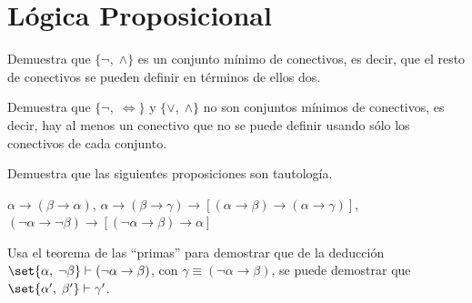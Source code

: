 \documentclass[fc]{tarea}
\begin{document}

\chapter{Lógica Proposicional}

\begin{exercise} Demuestra que \(\{\neg,\;\land\}\) es un conjunto mínimo de conectivos, es decir, 
  que el resto de conectivos se pueden definir en términos de ellos dos.
\end{exercise}  
  
\begin{exercise}
  Demuestra que \(\{\neg,\;\iff\}\) y \(\{\lor,\;\land\}\) no son conjuntos mínimos de conectivos, es decir, 
  hay al menos un conectivo que no se puede definir usando sólo los conectivos de cada conjunto.
\end{exercise}

\begin{exercise}
  Demuestra que las siguientes proposiciones son tautología.
  \begin{tasks}
   \task \(\alpha \rightarrow (\beta \rightarrow \alpha) \),
   \task \(\alpha \rightarrow(\beta \rightarrow \gamma) \rightarrow [(\alpha \rightarrow \beta)\rightarrow(\alpha \rightarrow \gamma)] \), 
    \task \( (\neg \alpha \rightarrow \neg \beta) \rightarrow [(\neg \alpha \rightarrow \beta)\rightarrow \alpha] \)
  \end{tasks}
\end{exercise}


\begin{exercise}
  Usa el teorema de las \enquote{primas} para demostrar que de la deducción \(\set{\alpha,\;\neg \beta}\vdash (\neg \alpha \rightarrow \beta)\), con \(\gamma \equiv (\neg \alpha \rightarrow \beta)\), se puede demostrar que \(\set{\alpha',\;\beta'}\vdash \gamma'\).
\end{exercise}
\end{document}
